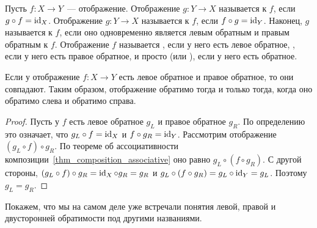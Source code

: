 \begin{definition}\label{dfn:inverse-map}
Пусть $f\colon X\to Y$~--- отображение. Отображение $g\colon Y\to X$
называется  к
$f$, если $g\circ f = \operatorname{id}_X$. Отображение $g\colon Y\to X$ называется
 к $f$, если
$f\circ g = \operatorname{id}_Y$. Наконец, $g$ называется
 к $f$, если
оно одновременно является левым обратным и правым обратным к $f$.
Отображение $f$ называется
,
если у него есть левое обратное,
, если у
него есть правое  обратное, и просто
 (или
),
если у него есть обратное.
\end{definition}

\begin{lemma}\label{lemma:invertible_left_and_right}
Если у отображение $f\colon X\to Y$ есть левое обратное и правое
обратное, то они совпадают. Таким образом, отображение обратимо тогда
и только тогда, когда оно обратимо слева и обратимо справа.
\end{lemma}
\begin{proof}
Пусть у $f$ есть левое обратное $g_L$ и правое обратное $g_R$. По
определению это означает, что
$g_L\circ f=\operatorname{id}_X$ и $f\circ g_R = \operatorname{id}_Y$.
Рассмотрим отображение $(g_L\circ f)\circ g_R$. По теореме об
ассоциативности композиции~\ref{thm_composition_associative} оно равно
$g_L\circ (f\circ g_R)$. С другой стороны,
$(g_L\circ f)\circ g_R = \operatorname{id}_X\circ g_R = g_R$ и
$g_L\circ (f\circ g_R) = g_L\circ\operatorname{id}_Y = g_L$. Поэтому $g_L = g_R$.
\end{proof}

Покажем, что мы на самом деле уже встречали понятия левой, правой и
двусторонней обратимости под другими названиями.

